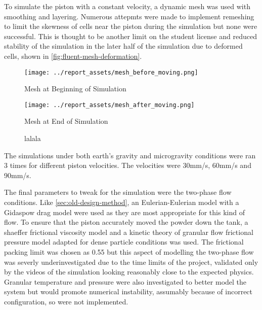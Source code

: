 To simulate the piston with a constant velocity, a dynamic mesh was used with smoothing and layering. Numerous attepmts were made to implement remeshing to limit the skewness of cells near the piston during the simulation but none were successful. This is thought to be another limit on the student license and reduced stability of the simulation in the later half of the simulation due to deformed cells, shown in \autoref{fig:fluent-mesh-deformation}.
\begin{figure}[htbp]
    \centering

    \begin{minipage}{0.45\textwidth}
        \centering
        \texttt{[image: ../report\_assets/mesh\_before\_moving.png]}
        \caption{Mesh at Beginning of Simulation}\label{fig:beginning-mesh}
    \end{minipage}
    \hfill
    \begin{minipage}{0.45\textwidth}
        \centering
        \texttt{[image: ../report\_assets/mesh\_after\_moving.png]}
        \caption{Mesh at End of Simulation}
    \end{minipage}
    \caption{lalala}\label{fig:fluent-mesh-deformation}
\end{figure}
The simulations under both earth's gravity and microgravity conditions were ran 3 times for different piston velocities. The velocities were 30mm/s, 60mm/s and 90mm/s.

The final parameters to tweak for the simulation were the two-phase flow conditions. Like \autoref{sec:old-design-method}, an Eulerian-Eulerian model with a Gidaspow drag model were used as they are most appropriate for this kind of flow. To ensure that the piston accurately moved the powder down the tank, a shaeffer frictional viscosity model and a kinetic theory of granular flow frictional pressure model adapted for dense particle conditions was used. The frictional packing limit was chosen as 0.55 but this aspect of modelling the two-phase flow was severly underinvestigated due to the time limits of the project, validated only by the videos of the simulation looking reasonably close to the expected physics. Granular temperature and pressure were also investigated to better model the system but would promote numerical instability, assumably because of incorrect configuration, so were not implemented.


















